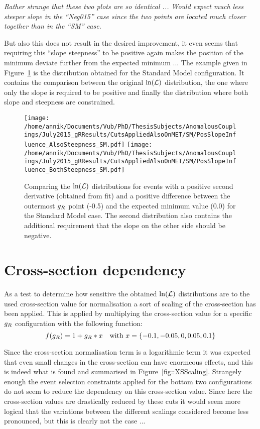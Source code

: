 \textit{Rather strange that these two plots are so identical ... Would expect much less steeper slope in the ``Neg015'' case since the two points are located much closer together than in the ``SM'' case.}

But also this does not result in the desired improvement, it even seems that requiring this ``slope steepness'' to be positive again makes the position of the minimum deviate further from the expected minimum ... The example given in Figure~\ref{fig::LogLik_PosSlope_PosSteepness} is the distribution obtained for the Standard Model configuration. It contains the comparison between the original $\ln(\mathcal{L})$ distribution, the one where only the slope is required to be positive and finally the distribution where both slope and steepness are constrained.

\begin{figure}[h!t]
 \centering
 \texttt{[image: /home/annik/Documents/Vub/PhD/ThesisSubjects/AnomalousCouplings/July2015\_gRResults/CutsAppliedAlsoOnMET/SM/PosSlopeInfluence\_AlsoSteepness\_SM.pdf]}
 \texttt{[image: /home/annik/Documents/Vub/PhD/ThesisSubjects/AnomalousCouplings/July2015\_gRResults/CutsAppliedAlsoOnMET/SM/PosSlopeInfluence\_BothSteepness\_SM.pdf]} 
 \caption{Comparing the $\ln(\mathcal{L})$ distributions for events with a positive second derivative (obtained from fit) and a positive difference between the outermost $g_{R}$ point (-0.5) and the expected minimum value (0.0) for the Standard Model case. The second distribution also contains the additional requirement that the slope on the other side should be negative.} \label{fig::LogLik_PosSlope_PosSteepness}
\end{figure}


\section{Cross-section dependency}

As a test to determine how sensitive the obtained $\ln(\mathcal{L})$ distributions are to the used cross-section value for normalisation a sort of scaling of the cross-section has been applied. This is applied by multiplying the cross-section value for a specific $g_{R}$ configuration with the following function:
\begin{equation}
 f(g_{R}) = 1 + g_{R} *x ~ ~ ~ \textrm{with } x = \left\lbrace -0.1, -0.05, 0, 0.05, 0.1 \right\rbrace
\end{equation}

Since the cross-section normalisation term is a logarithmic term it was expected that even small changes in the cross-section can have enormeous effects, and this is indeed what is found and summarised in Figure~\ref{fig::XSScaling}. Strangely enough the event selection constraints applied for the bottom two configurations do not seem to reduce the dependency on this cross-section value. Since here the cross-section values are drastically reduced by these cuts it would seem more logical that the variations between the different scalings considered become less pronounced, but this is clearly not the case ...

